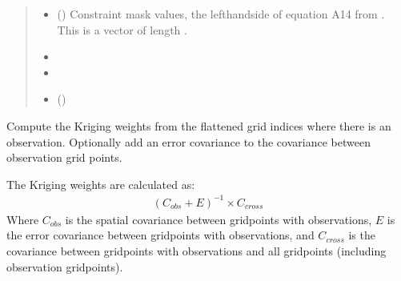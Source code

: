 \documentclass[letterpaper,10pt,english]{sphinxmanual}
\begin{document}
\begin{fulllineitems}
\begin{fulllineitems}
\begin{quote}
\begin{description}
\sphinxAtStartPar
{}

\sphinxAtStartPar
\begin{itemize}
\item {}
\sphinxAtStartPar
{} () \textendash{} Constraint mask values, the left\sphinxhyphen{}hand\sphinxhyphen{}side of equation A14 from
. This is a vector of length .

\item {}
\sphinxAtStartPar
{}

\item {}
\sphinxAtStartPar
{}

\item {}
\sphinxAtStartPar
\sphinxstylestrong{{[}Morice\_2021{]}\_} ()

\end{itemize}


\end{description}\end{quote}

\end{fulllineitems}


\begin{fulllineitems}
\label{\detokenize{kriging:glomar_gridding.stochastic.StochasticKriging.get_kriging_weights}}
\pysigstartsignatures
\pysiglinewithargsret
{}
{\sphinxparamcomma {}}
{}
\pysigstopsignatures
\sphinxAtStartPar
Compute the Kriging weights from the flattened grid indices where
there is an observation. Optionally add an error covariance to the
covariance between observation grid points.

\sphinxAtStartPar
The Kriging weights are calculated as:
\begin{equation*}
\begin{split}(C_{obs} + E)^{-1} \times C_{cross}\end{split}
\end{equation*}
\sphinxAtStartPar
Where \(C_{obs}\) is the spatial covariance between grid\sphinxhyphen{}points
with observations, \(E\) is the error covariance between grid\sphinxhyphen{}points
with observations, and \(C_{cross}\) is the covariance between
grid\sphinxhyphen{}points with observations and all grid\sphinxhyphen{}points (including observation
grid\sphinxhyphen{}points).


\end{fulllineitems}
\end{fulllineitems}
\end{document}
